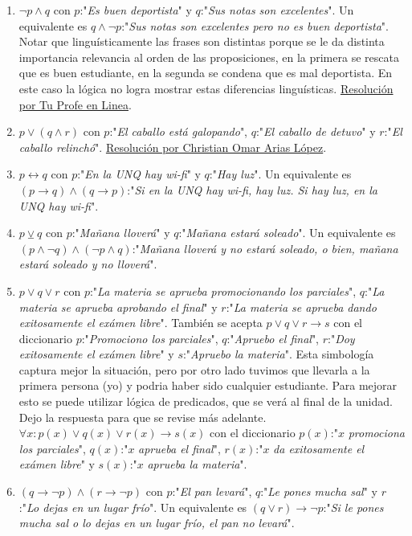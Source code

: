\documentclass[a4paper]{article}
\newcommand{\then}{\to}
\newcommand{\eq}{\leftrightarrow}
\newcommand{\xor}{\veebar}
\begin{document}
\begin{enumerate}
\begin{enumerate} [label=(\alph*)]
		\item $\neg p \land q$ con $p$:"\textit{Es buen deportista}" y $q$:"\textit{Sus notas son excelentes}". Un equivalente es $q \land \neg p$:"\textit{Sus notas son excelentes pero no es buen deportista}". Notar que linguísticamente las frases son distintas porque se le da distinta importancia relevancia al orden de las proposiciones, en la primera se rescata que es buen estudiante, en la segunda se condena que es mal deportista. En este caso la lógica no logra mostrar estas diferencias linguísticas. \href{https://youtu.be/HXzyX5XGPp8?t=503}{Resolución por Tu Profe en Linea}.
		\item $p \lor (q \land r)$ con $p$:"\textit{El caballo está galopando}", $q$:"\textit{El caballo de detuvo}" y $r$:"\textit{El caballo relinchó}". \href{https://youtu.be/TgwraosKUuY?t=70}{Resolución por Christian Omar Arias López}.
		\item $p\eq q$ con $p$:"\textit{En la UNQ hay wi-fi}" y $q$:"\textit{Hay luz}". Un equivalente es $(p \then q) \land (q \then p)$:"\textit{Si en la UNQ hay wi-fi, hay luz. Si hay luz, en la UNQ hay wi-fi}".
		\item $p \xor q$ con $p$:"\textit{Mañana lloverá}" y $q$:"\textit{Mañana estará soleado}". Un equivalente es $(p \land \neg q) \land (\neg p \land q)$:"\textit{Mañana lloverá y no estará soleado, o bien, mañana estará soleado y no lloverá}". 
		\item $p \lor q \lor r$ con $p$:"\textit{La materia se aprueba promocionando los parciales}", $q$:"\textit{La materia se aprueba aprobando el final}" y $r$:"\textit{La materia se aprueba dando exitosamente el exámen libre}". También se acepta $p \lor q \lor r \then s$ con el diccionario $p$:"\textit{Promociono los parciales}", $q$:"\textit{Apruebo el final}", $r$:"\textit{Doy exitosamente el exámen libre}" y $s$:"\textit{Apruebo la materia}". Esta simbología captura mejor la situación, pero por otro lado tuvimos que llevarla a la primera persona (yo) y podria haber sido cualquier estudiante. Para mejorar esto se puede utilizar lógica de predicados, que se verá al final de la unidad. Dejo la respuesta para que se revise más adelante. $\forall x: p(x) \lor q(x) \lor r(x) \then s(x)$ con el diccionario $p(x)$:"$x$ \textit{promociona los parciales}", $q(x)$:"$x$ \textit{aprueba el final}", $r(x)$:"$x$ \textit{da exitosamente el exámen libre}" y $s(x)$:"$x$ \textit{aprueba la materia}".
		\item $(q\then \neg p)  \land  (r\then \neg p)$ con $p$:"\textit{El pan levará}", $q$:"\textit{Le pones mucha sal}" y $r$:"\textit{Lo dejas en un lugar frío}". Un equivalente es $(q \lor r) \then \neg p$:"\textit{Si le pones mucha sal o lo dejas en un lugar frío, el pan no levará}".

\end{enumerate}
\end{enumerate}
\end{document}
